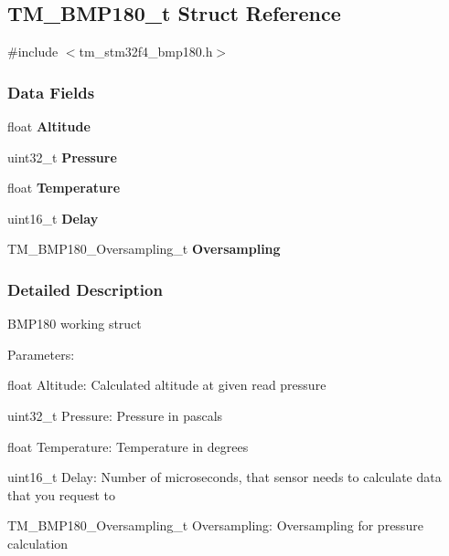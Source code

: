 \hypertarget{struct_t_m___b_m_p180__t}{}\subsection{T\+M\+\_\+\+B\+M\+P180\+\_\+t Struct Reference}
\label{struct_t_m___b_m_p180__t}


{\ttfamily \#include $<$tm\+\_\+stm32f4\+\_\+bmp180.\+h$>$}

\subsubsection*{Data Fields}
\begin{DoxyCompactItemize}
\item 
\hypertarget{struct_t_m___b_m_p180__t_acc81deedbd68806fa549c2b92a3d21e0}{}float {\bfseries Altitude}\label{struct_t_m___b_m_p180__t_acc81deedbd68806fa549c2b92a3d21e0}

\item 
\hypertarget{struct_t_m___b_m_p180__t_aab91169cc86c5a56fe7def7cebd4fba6}{}uint32\+\_\+t {\bfseries Pressure}\label{struct_t_m___b_m_p180__t_aab91169cc86c5a56fe7def7cebd4fba6}

\item 
\hypertarget{struct_t_m___b_m_p180__t_afa66fac91ab948980be979b768e67c5a}{}float {\bfseries Temperature}\label{struct_t_m___b_m_p180__t_afa66fac91ab948980be979b768e67c5a}

\item 
\hypertarget{struct_t_m___b_m_p180__t_a16a366f1914db6923e6f49ba15572ea2}{}uint16\+\_\+t {\bfseries Delay}\label{struct_t_m___b_m_p180__t_a16a366f1914db6923e6f49ba15572ea2}

\item 
\hypertarget{struct_t_m___b_m_p180__t_a0430e515cec185f2521694979067b452}{}T\+M\+\_\+\+B\+M\+P180\+\_\+\+Oversampling\+\_\+t {\bfseries Oversampling}\label{struct_t_m___b_m_p180__t_a0430e515cec185f2521694979067b452}

\end{DoxyCompactItemize}


\subsubsection{Detailed Description}
B\+M\+P180 working struct

Parameters\+:
\begin{DoxyItemize}
\item float Altitude\+: Calculated altitude at given read pressure
\item uint32\+\_\+t Pressure\+: Pressure in pascals
\item float Temperature\+: Temperature in degrees
\item uint16\+\_\+t Delay\+: Number of microseconds, that sensor needs to calculate data that you request to
\item T\+M\+\_\+\+B\+M\+P180\+\_\+\+Oversampling\+\_\+t Oversampling\+: Oversampling for pressure calculation 
\end{DoxyItemize}